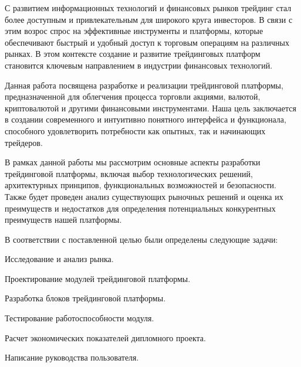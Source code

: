 \label{sec:intro}

С развитием информационных технологий и финансовых рынков трейдинг стал более доступным и привлекательным для широкого круга инвесторов.
В связи с этим возрос спрос на эффективные инструменты и платформы, которые обеспечивают быстрый и удобный доступ к торговым операциям на различных рынках.
В этом контексте создание и развитие трейдинговых платформ становится ключевым направлением в индустрии финансовых технологий.

Данная работа посвящена разработке и реализации трейдинговой платформы, предназначенной для облегчения процесса торговли акциями, валютой, криптовалютой и другими финансовыми инструментами.
Наша цель заключается в создании современного и интуитивно понятного интерфейса и функционала, способного удовлетворить потребности как опытных, так и начинающих трейдеров.

В рамках данной работы мы рассмотрим основные аспекты разработки трейдинговой платформы, включая выбор технологических решений, архитектурных принципов, функциональных возможностей и безопасности.
Также будет проведен анализ существующих рыночных решений и оценка их преимуществ и недостатков для определения потенциальных конкурентных преимуществ нашей платформы.

В соответствии с поставленной целью были определены следующие задачи:
\begin{enumerate_num}
    \item Исследование и анализ рынка.
    \item Проектирование модулей трейдинговой платформы.
    \item Разработка блоков трейдинговой платформы.
    \item Тестирование работоспособности модуля.
    \item Расчет экономических показателей дипломного проекта.
    \item Написание руководства пользователя.
\end{enumerate_num}



